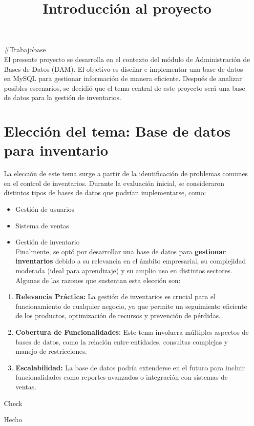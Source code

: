 \documentclass[
]{article}
\title{Introducción al proyecto}
\author{}
\date{}
\providecommand{\tightlist}{%
  \setlength{\itemsep}{0pt}\setlength{\parskip}{0pt}}
\begin{document}
\maketitle

\#Trabajobase\\
El presente proyecto se desarrolla en el contexto del módulo de
Administración de Bases de Datos (DAM). El objetivo es diseñar e
implementar una base de datos en MySQL para gestionar información de
manera eficiente. Después de analizar posibles escenarios, se decidió
que el tema central de este proyecto será una base de datos para la
gestión de inventarios.

\section{Elección del tema: Base de datos para
inventario}\label{elecciuxf3n-del-tema-base-de-datos-para-inventario}

La elección de este tema surge a partir de la identificación de
problemas comunes en el control de inventarios. Durante la evaluación
inicial, se consideraron distintos tipos de bases de datos que podrían
implementarse, como:

\begin{itemize}
\tightlist
\item
  Gestión de usuarios
\item
  Sistema de ventas
\item
  Gestión de inventario\\
  Finalmente, se optó por desarrollar una base de datos para
  \textbf{gestionar inventarios} debido a su relevancia en el ámbito
  empresarial, su complejidad moderada (ideal para aprendizaje) y su
  amplio uso en distintos sectores. Algunas de las razones que sustentan
  esta elección son:
\end{itemize}

\begin{enumerate}
\tightlist
\item
  \textbf{Relevancia Práctica:} La gestión de inventarios es crucial
  para el funcionamiento de cualquier negocio, ya que permite un
  seguimiento eficiente de los productos, optimización de recursos y
  prevención de pérdidas.
\item
  \textbf{Cobertura de Funcionalidades:} Este tema involucra múltiples
  aspectos de bases de datos, como la relación entre entidades,
  consultas complejas y manejo de restricciones.
\item
  \textbf{Escalabilidad:} La base de datos podría extenderse en el
  futuro para incluir funcionalidades como reportes avanzados o
  integración con sistemas de ventas.
\end{enumerate}

Check

Hecho
\end{document}
